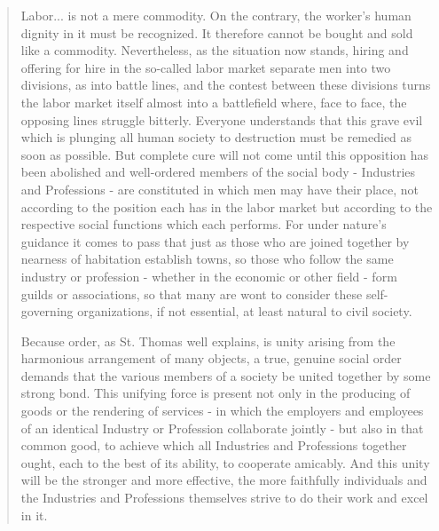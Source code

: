 \documentclass[letterpaper]{article}
\begin{document}
\begin{quote}
  Labor... is not a mere commodity. On the contrary, the worker's human dignity in it must be recognized. It therefore cannot be bought and sold like a commodity. Nevertheless, as the situation now stands, hiring and offering for hire in the so-called labor market separate men into two divisions, as into battle lines, and the contest between these divisions turns the labor market itself almost into a battlefield where, face to face, the opposing lines struggle bitterly. Everyone understands that this grave evil which is plunging all human society to destruction must be remedied as soon as possible. But complete cure will not come until this opposition has been abolished and well-ordered members of the social body - Industries and Professions - are constituted in which men may have their place, not according to the position each has in the labor market but according to the respective social functions which each performs. For under nature's guidance it comes to pass that just as those who are joined together by nearness of habitation establish towns, so those who follow the same industry or profession - whether in the economic or other field - form guilds or associations, so that many are wont to consider these self-governing organizations, if not essential, at least natural to civil society.

  Because order, as St. Thomas well explains, is unity arising from the harmonious arrangement of many objects, a true, genuine social order demands that the various members of a society be united together by some strong bond. This unifying force is present not only in the producing of goods or the rendering of services - in which the employers and employees of an identical Industry or Profession collaborate jointly - but also in that common good, to achieve which all Industries and Professions together ought, each to the best of its ability, to cooperate amicably. And this unity will be the stronger and more effective, the more faithfully individuals and the Industries and Professions themselves strive to do their work and excel in it. 
\end{quote}

\end{document}
